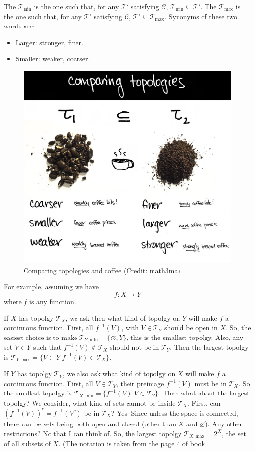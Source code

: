 \documentclass{article}
\begin{document}
The  $\mathcal{T}_\text{min}$ is the one such
that, for any $\mathcal{T}'$ satisfying $\mathcal{C}$,
$\mathcal{T}_\text{min}\subseteq \mathcal{T}'$. The  $\mathcal{T}_\text{max}$ is the one such that, for any
$\mathcal{T}'$ satisfying $\mathcal{C}$, $\mathcal{T}'\subseteq
\mathcal{T}_\text{max}$.
Synonyms of these two words are:
\begin{itemize}
    \item Larger: stronger, finer.
    \item Smaller: weaker, coarser.
\end{itemize}
\begin{figure}[H]
    \centering
    \includegraphics[width=0.65\linewidth]{pics/comparing-topologies-and-coffee.jpg}
    \caption{Comparing topologies and coffee (Credit:
    \href{http://www.math3ma.com/the-back-pocket/2016/8/26/comparing-topologies}{math3ma})}
\end{figure}
For example, assuming we have
\begin{equation}
    f: X\to Y
\end{equation}
where $f$ is any function.

If $X$ has topolgy $\mathcal{T}_X$, we ask then what kind of topolgy on
$Y$ will make $f$ a continuous function. First, all $f^{-1}(V)$, with
$V\in \mathcal{T}_Y$ should be open in $X$. So, the easiest choice is to
make $\mathcal{T}_{Y,\text{min}}=\{\varnothing,Y\}$, this is the
smallest topolgy.  Also, any set $V\in Y$ such that $f^{-1}(V)\notin
\mathcal{T}_X$ should not be in $\mathcal{T}_Y$. Then the largest
topolgy is $\mathcal{T}_{Y,\text{max}}=\{ V\subset Y| f^{-1}(V)\in
\mathcal{T}_X\}$.

If $Y$ has topolgy $\mathcal{T}_Y$, we also ask what kind of topolgy
on $X$ will make $f$ a continuous function. First, all $V\in
\mathcal{T}_Y$, their preimage $f^{-1}(V)$ must be in $\mathcal{T}_X$.
So the smallest topolgy is
$\mathcal{T}_{X,\text{min}}=\{f^{-1}(V)|V\in\mathcal{T}_Y\}$. Than
what about the largest topolgy? We consider, what kind of sets cannot
be inside $\mathcal{T}_X$. First, can $(f^{-1}(V))^c=f^{-1}(V^c)$ be
in $\mathcal{T}_X$? Yes. Since unless the space is connected, there
can be sets being both open and closed (other than $X$ and
$\varnothing$). Any other restrictions? No that I can think of. So,
the largest topolgy $\mathcal{T}_{X,\text{max}}=2^X$, the set of all
subsets of $X$. (The notation  is taken from the page 4
of book \cite{Singer.Thorpe}.
\end{document}
